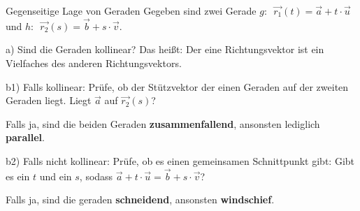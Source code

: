 \begin{rezept}{Gegenseitige Lage von Geraden}{}
Gegeben sind zwei Gerade $g:\,\,\, \vec{r_1}(t) = \vec{a} +
t\cdot{}\vec{u}$ und $h:\,\,\, \vec{r_2}(s) = \vec{b} +
s\cdot{}\vec{v}$.

a) Sind die Geraden kollinear? Das heißt: Der eine Richtungsvektor ist
ein Vielfaches des anderen Richtungsvektors.

b1) Falls kollinear:
 Prüfe, ob der Stützvektor der einen Geraden auf der zweiten Geraden
 liegt. Liegt $\vec{a}$ auf $\vec{r_2}(s)$?

 Falls ja, sind die beiden Geraden \textbf{zusammenfallend}, ansonsten
 lediglich \textbf{parallel}.

 b2) Falls nicht kollinear:
 Prüfe, ob es einen gemeinsamen Schnittpunkt gibt:
 Gibt es ein $t$ und ein $s$, sodass $\vec{a} + t\cdot{} \vec{u} =
 \vec{b} + s\cdot{} \vec{v}$?

 Falls ja, sind die geraden \textbf{schneidend}, ansonsten \textbf{windschief}.


\end{rezept}

\newpage

